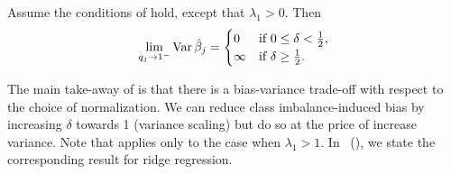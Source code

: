 \begin{theorem}
  \label{thm:classbalance-variance}
  Assume the conditions of  hold, except that
  \(\lambda_1 > 0\). Then
  \[
    \lim_{q_j \rightarrow 1^-} \operatorname{Var} \hat{\beta}_j =
    \begin{cases}
      0      & \text{if } 0 \leq \delta < \frac{1}{2}, \\
      \infty & \text{if } \delta \geq \frac{1}{2}.
    \end{cases}
  \]
\end{theorem}

The main take-away of  is that there
is a bias-variance trade-off with respect to the choice of normalization. We can reduce
class imbalance-induced bias by increasing \(\delta\) towards 1 (variance scaling) but do
so at the price of increase variance. Note that  applies
only to the case when \(\lambda_1 > 1\). In
~(), we state the corresponding result
for ridge regression.



